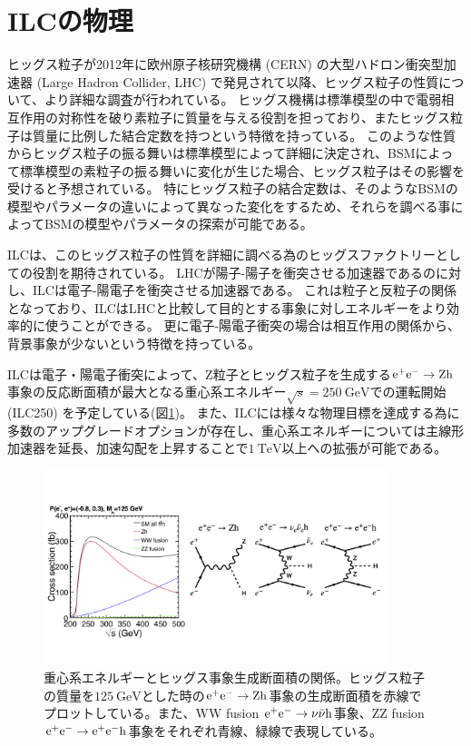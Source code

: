 \section{ILCの物理} \label{Intro:PhysicsofILC}

ヒッグス粒子が2012年に欧州原子核研究機構 (CERN) の大型ハドロン衝突型加速器 (Large Hadron Collider, LHC) で発見されて以降、ヒッグス粒子の性質について、より詳細な調査が行われている。
ヒッグス機構は標準模型の中で電弱相互作用の対称性を破り素粒子に質量を与える役割を担っており、またヒッグス粒子は質量に比例した結合定数を持つという特徴を持っている。
このような性質からヒッグス粒子の振る舞いは標準模型によって詳細に決定され、BSMによって標準模型の素粒子の振る舞いに変化が生じた場合、ヒッグス粒子はその影響を受けると予想されている。
特にヒッグス粒子の結合定数は、そのようなBSMの模型やパラメータの違いによって異なった変化をするため、それらを調べる事によってBSMの模型やパラメータの探索が可能である。

ILCは、このヒッグス粒子の性質を詳細に調べる為のヒッグスファクトリーとしての役割を期待されている。
LHCが陽子-陽子を衝突させる加速器であるのに対し、ILCは電子-陽電子を衝突させる加速器である。
これは粒子と反粒子の関係となっており、ILCはLHCと比較して目的とする事象に対しエネルギーをより効率的に使うことができる。
更に電子-陽電子衝突の場合は相互作用の関係から、背景事象が少ないという特徴を持っている。

ILCは電子・陽電子衝突によって、Z粒子とヒッグス粒子を生成する$\rm e^+e^- \to Zh$事象の反応断面積が最大となる重心系エネルギー$\sqrt{s}=250\ \mathrm{GeV}$での運転開始 (ILC250) を予定している(図\ref{4eetoZH})。
また、ILCには様々な物理目標を達成する為に多数のアップグレードオプションが存在し、重心系エネルギーについては主線形加速器を延長、加速勾配を上昇することで$1\ \mathrm{TeV}$以上への拡張が可能である。

\begin{figure}[htbp]
 \centering
 \includegraphics[trim= 0 50 0 50, width=0.9\textwidth, clip]{Figure/1Introduction/4eetoZH.png}
 \caption[重心系エネルギーとヒッグス事象生成断面積の関係]{重心系エネルギーとヒッグス事象生成断面積の関係\cite{ILCTDRVP}。ヒッグス粒子の質量を$125\ \mathrm{GeV}$とした時の$\rm e^+e^- \to Zh$事象の生成断面積を赤線でプロットしている。また、WW fusion $\rm e^+e^- \to \nu \bar{\nu} h$事象、ZZ fusion $\rm e^+e^- \to e^+ e^- h$事象をそれぞれ青線、緑線で表現している。}
 \label{4eetoZH}
\end{figure}

